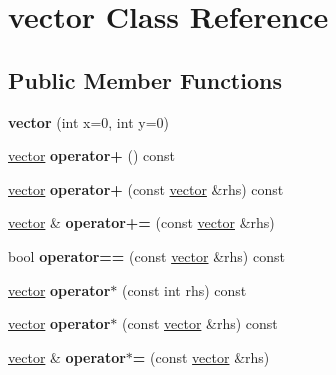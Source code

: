 \hypertarget{classvector}{}\section{vector Class Reference}
\label{classvector}
\subsection*{Public Member Functions}
\begin{DoxyCompactItemize}
\item 
\mbox{\label{classvector_ada69c108ec9393e6f70bdfcd58366cbf}} 
{\bfseries vector} (int x=0, int y=0)
\item 
\mbox{\label{classvector_a9af16b41f973cd073b089bf5371e8a70}} 
\hyperlink{classvector}{vector} {\bfseries operator+} () const
\item 
\mbox{\label{classvector_a9d639bc53d77f17c6ba3af1dd9549424}} 
\hyperlink{classvector}{vector} {\bfseries operator+} (const \hyperlink{classvector}{vector} \&rhs) const
\item 
\mbox{\label{classvector_a401c12597814627f350a8cd663b6dba5}} 
\hyperlink{classvector}{vector} \& {\bfseries operator+=} (const \hyperlink{classvector}{vector} \&rhs)
\item 
\mbox{\label{classvector_a0066b879f704f7d344ec9cd2a2f57ea3}} 
bool {\bfseries operator==} (const \hyperlink{classvector}{vector} \&rhs) const
\item 
\mbox{\label{classvector_ad4e924ee21af1367f8724b2d94db110e}} 
\hyperlink{classvector}{vector} {\bfseries operator$\ast$} (const int rhs) const
\item 
\mbox{\label{classvector_a9ef97fde561d0998f1db1af7c9fbbff8}} 
\hyperlink{classvector}{vector} {\bfseries operator$\ast$} (const \hyperlink{classvector}{vector} \&rhs) const
\item 
\mbox{\label{classvector_ad7dba928c0f8e3bef217dd1d97ebfb8f}} 
\hyperlink{classvector}{vector} \& {\bfseries operator$\ast$=} (const \hyperlink{classvector}{vector} \&rhs)
\end{DoxyCompactItemize}
